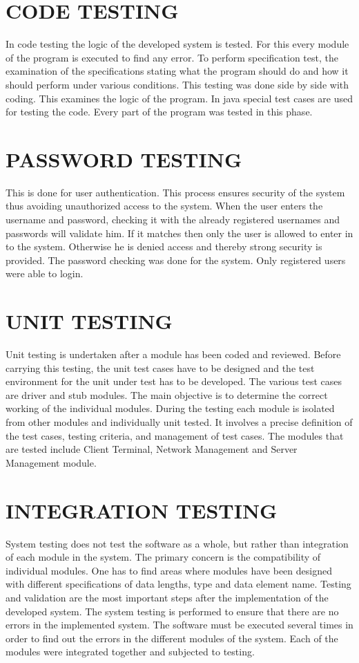 \documentclass[12pt,a4paper,oneside]{report}
\begin{document}
\section{CODE TESTING}
\par In code testing the logic of the developed system is tested. For this every module of the program is executed to find any error. To perform speciﬁcation test, the examination of the speciﬁcations stating what the program should do and how it should perform under various conditions. This testing was done side by side with coding. This examines the logic of the program. In java special test cases are used for testing the code. Every part of the program was tested in this phase.
\section{PASSWORD TESTING}
\par This is done for user authentication. This process ensures security of the system thus avoiding unauthorized access to the system. When the user enters the username and password, checking it with the already registered usernames and passwords will validate him. If it matches then only the user is allowed to enter in to the system. Otherwise he is denied access and thereby strong security is provided. The password checking was done for the system. Only registered users were able to login.
\section{UNIT TESTING}
Unit testing is undertaken after a module has been coded and reviewed. Before carrying this testing, the unit test cases have to be designed and the test environment for the unit under test has to be developed. The various test cases are driver and stub modules. The main objective is to determine the correct working of the individual modules. During the testing each module is isolated from other modules and individually unit tested. It involves a precise deﬁnition of the test cases, testing criteria, and management of test cases. The modules that are tested include Client Terminal, Network Management and Server Management module.
 \section{INTEGRATION TESTING}
System testing does not test the software as a whole, but rather than integration of each module in the system. The primary concern is the compatibility of individual modules. One has to find areas where modules have been designed with different speciﬁcations of data lengths, type and data element name. Testing and validation are the most important steps after the implementation of the developed system. The system testing is performed to ensure that there are no errors in the implemented system. The software must be executed several times in order to find out the errors in the different modules of the system. Each of the modules were integrated together and subjected to testing.
\end{document}
